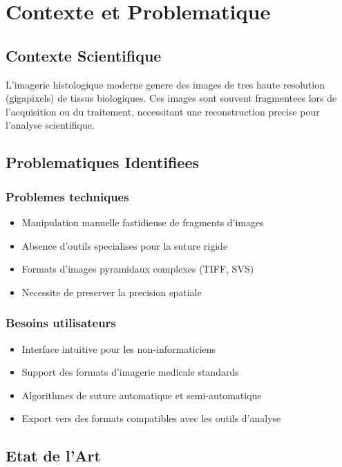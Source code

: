 \documentclass[12pt,a4paper]{article}
\begin{document}
\section{Contexte et Problematique}

\subsection{Contexte Scientifique}

L'imagerie histologique moderne genere des images de tres haute resolution (gigapixels) de tissus biologiques. Ces images sont souvent fragmentees lors de l'acquisition ou du traitement, necessitant une reconstruction precise pour l'analyse scientifique.

\subsection{Problematiques Identifiees}

\subsubsection{Problemes techniques}
\begin{itemize}
\item Manipulation manuelle fastidieuse de fragments d'images
\item Absence d'outils specialises pour la suture rigide
\item Formats d'images pyramidaux complexes (TIFF, SVS)
\item Necessite de preserver la precision spatiale
\end{itemize}

\subsubsection{Besoins utilisateurs}
\begin{itemize}
\item Interface intuitive pour les non-informaticiens
\item Support des formats d'imagerie medicale standards
\item Algorithmes de suture automatique et semi-automatique
\item Export vers des formats compatibles avec les outils d'analyse
\end{itemize}

\subsection{Etat de l'Art}
\end{document}
